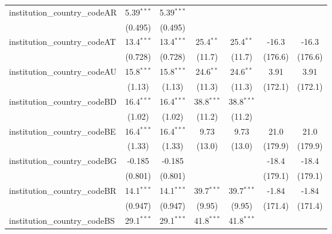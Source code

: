 \begin{tabular}{lcccccc}
   institution\_country\_codeAR          & 5.39$^{***}$  & 5.39$^{***}$  &               &               &               &   \\   
                                         & (0.495)       & (0.495)       &               &               &               &   \\   
   institution\_country\_codeAT          & 13.4$^{***}$  & 13.4$^{***}$  & 25.4$^{**}$   & 25.4$^{**}$   & -16.3         & -16.3\\   
                                         & (0.728)       & (0.728)       & (11.7)        & (11.7)        & (176.6)       & (176.6)\\   
   institution\_country\_codeAU          & 15.8$^{***}$  & 15.8$^{***}$  & 24.6$^{**}$   & 24.6$^{**}$   & 3.91          & 3.91\\   
                                         & (1.13)        & (1.13)        & (11.3)        & (11.3)        & (172.1)       & (172.1)\\   
   institution\_country\_codeBD          & 16.4$^{***}$  & 16.4$^{***}$  & 38.8$^{***}$  & 38.8$^{***}$  &               &   \\   
                                         & (1.02)        & (1.02)        & (11.2)        & (11.2)        &               &   \\   
   institution\_country\_codeBE          & 16.4$^{***}$  & 16.4$^{***}$  & 9.73          & 9.73          & 21.0          & 21.0\\   
                                         & (1.33)        & (1.33)        & (13.0)        & (13.0)        & (179.9)       & (179.9)\\   
   institution\_country\_codeBG          & -0.185        & -0.185        &               &               & -18.4         & -18.4\\   
                                         & (0.801)       & (0.801)       &               &               & (179.1)       & (179.1)\\   
   institution\_country\_codeBR          & 14.1$^{***}$  & 14.1$^{***}$  & 39.7$^{***}$  & 39.7$^{***}$  & -1.84         & -1.84\\   
                                         & (0.947)       & (0.947)       & (9.95)        & (9.95)        & (171.4)       & (171.4)\\   
   institution\_country\_codeBS          & 29.1$^{***}$  & 29.1$^{***}$  & 41.8$^{***}$  & 41.8$^{***}$  &               &   \\   

\end{tabular}
